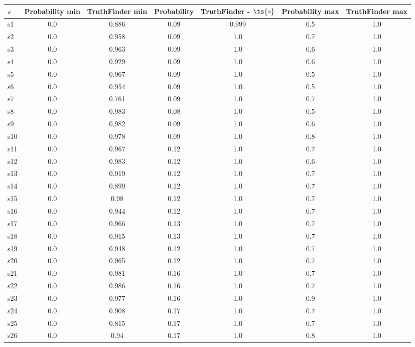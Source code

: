 \documentclass{article}
\begin{document}
\noindent\begin{tabular}{|l|c|c|c|c|c|c|}
\hline
$s$& Probability min & TruthFinder min & Probability & TruthFinder - $\ts{s}$ & Probability max & TruthFinder max\\
\hline
s1 &0.0 & 0.886 & 0.09 & 0.999 & 0.5 & 1.0\\
\hline
s2 &0.0 & 0.958 & 0.09 & 1.0 & 0.7 & 1.0\\
\hline
s3 &0.0 & 0.963 & 0.09 & 1.0 & 0.6 & 1.0\\
\hline
s4 &0.0 & 0.929 & 0.09 & 1.0 & 0.6 & 1.0\\
\hline
s5 &0.0 & 0.967 & 0.09 & 1.0 & 0.5 & 1.0\\
\hline
s6 &0.0 & 0.954 & 0.09 & 1.0 & 0.5 & 1.0\\
\hline
s7 &0.0 & 0.761 & 0.09 & 1.0 & 0.7 & 1.0\\
\hline
s8 &0.0 & 0.983 & 0.08 & 1.0 & 0.5 & 1.0\\
\hline
s9 &0.0 & 0.982 & 0.09 & 1.0 & 0.6 & 1.0\\
\hline
s10 &0.0 & 0.978 & 0.09 & 1.0 & 0.8 & 1.0\\
\hline
s11 &0.0 & 0.967 & 0.12 & 1.0 & 0.7 & 1.0\\
\hline
s12 &0.0 & 0.983 & 0.12 & 1.0 & 0.6 & 1.0\\
\hline
s13 &0.0 & 0.919 & 0.12 & 1.0 & 0.7 & 1.0\\
\hline
s14 &0.0 & 0.899 & 0.12 & 1.0 & 0.7 & 1.0\\
\hline
s15 &0.0 & 0.98 & 0.12 & 1.0 & 0.7 & 1.0\\
\hline
s16 &0.0 & 0.944 & 0.12 & 1.0 & 0.7 & 1.0\\
\hline
s17 &0.0 & 0.966 & 0.13 & 1.0 & 0.7 & 1.0\\
\hline
s18 &0.0 & 0.915 & 0.13 & 1.0 & 0.7 & 1.0\\
\hline
s19 &0.0 & 0.948 & 0.12 & 1.0 & 0.7 & 1.0\\
\hline
s20 &0.0 & 0.965 & 0.12 & 1.0 & 0.7 & 1.0\\
\hline
s21 &0.0 & 0.981 & 0.16 & 1.0 & 0.7 & 1.0\\
\hline
s22 &0.0 & 0.986 & 0.16 & 1.0 & 0.7 & 1.0\\
\hline
s23 &0.0 & 0.977 & 0.16 & 1.0 & 0.9 & 1.0\\
\hline
s24 &0.0 & 0.908 & 0.17 & 1.0 & 0.7 & 1.0\\
\hline
s25 &0.0 & 0.815 & 0.17 & 1.0 & 0.7 & 1.0\\
\hline
s26 &0.0 & 0.94 & 0.17 & 1.0 & 0.8 & 1.0\\

\end{tabular}
\end{document}
